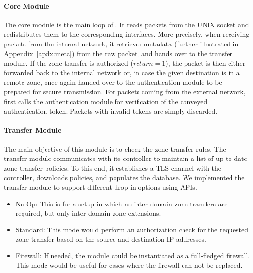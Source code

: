 
\paragraph{Core Module}
The core module is the main loop of \tp. It reads packets from the UNIX socket and
redistributes them to the corresponding interfaces. More precisely, when receiving packets
from the internal network, it retrieves metadata (further illustrated in 
Appendix~\ref{apdx:meta}) from the raw packet, and hands over to the transfer module. 
If the zone transfer is authorized ($return=1$),
the packet is then either forwarded back to the internal network or, in case the given destination is in a remote zone, once again handed over to the authentication module to be prepared for secure transmission. 
For packets coming from the external network, \tp first calls the authentication module for
verification of the conveyed authentication token. Packets with invalid tokens are simply discarded.

\paragraph{Transfer Module}
The main objective of this module is to check the zone transfer rules. The transfer
module communicates with its controller to maintain a list of up-to-date zone transfer policies.
To this end, it establishes a TLS channel with the controller, downloads policies,
and populates the database. 
We implemented the transfer module to support different drop-in options using APIs.

\begin{itemize}
	\item No-Op: This is for a setup in which no inter-domain zone transfers are required, 
		  but only inter-domain zone extensions.
	\item Standard: This mode would perform an authorization check for the requested
	      zone transfer based on the source and destination IP addresses. 
	\item Firewall: If needed, the module could be instantiated as a full-fledged firewall.
	      This mode would be useful for cases where the firewall can not be replaced. 
\end{itemize}

